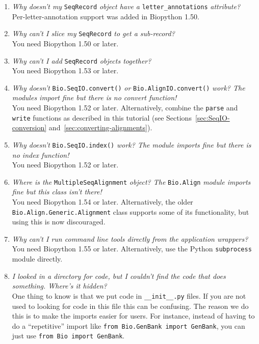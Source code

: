 \documentclass{report}
\begin{document}
\begin{enumerate}
  \item \emph{Why doesn't my} \verb|SeqRecord| \emph{object have a} \verb|letter_annotations| \emph{attribute?} \\
  Per-letter-annotation support was added in Biopython 1.50.
  
 \item \emph{Why can't I slice my} \verb|SeqRecord| \emph{to get a sub-record?} \\
  You need Biopython 1.50 or later.

 \item \emph{Why can't I add} \verb|SeqRecord| \emph{objects together?} \\
  You need Biopython 1.53 or later.

  \item \emph{Why doesn't} \verb|Bio.SeqIO.convert()| \emph{or} \verb|Bio.AlignIO.convert()| \emph{work? The modules import fine but there is no convert function!} \\
  You need Biopython 1.52 or later. Alternatively, combine the \verb|parse| and \verb|write|
  functions as described in this tutorial (see Sections~\ref{sec:SeqIO-conversion} and~\ref{sec:converting-alignments}).

  \item \emph{Why doesn't} \verb|Bio.SeqIO.index()| \emph{work? The module imports fine but there is no index function!} \\
  You need Biopython 1.52 or later.
  
  \item \emph{Where is the} \verb|MultipleSeqAlignment| \emph{object? The} \verb|Bio.Align| \emph{module imports fine but this class isn't there!} \\
  You need Biopython 1.54 or later. Alternatively, the older \verb|Bio.Align.Generic.Alignment| class supports some of its functionality, but using this is now discouraged.

  \item \emph{Why can't I run command line tools directly from the application wrappers?} \\
  You need Biopython 1.55 or later. Alternatively, use the Python \verb|subprocess| module directly.
  
  \item \emph{I looked in a directory for code, but I couldn't find the code that does something. Where's it hidden?} \\
  One thing to know is that we put code in \verb|__init__.py| files. If you are not used to looking for code in this file this can be confusing. The reason we do this is to make the imports easier for users. For instance, instead of having to do a ``repetitive'' import like \verb|from Bio.GenBank import GenBank|, you can just use \verb|from Bio import GenBank|.


\end{enumerate}
\end{document}

